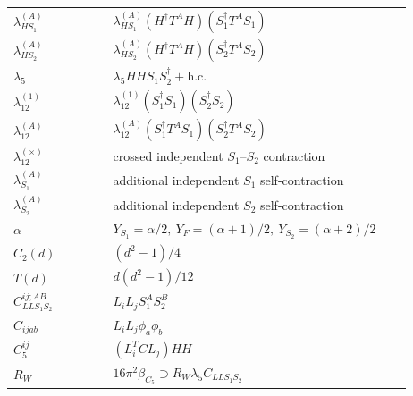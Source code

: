 \documentclass[8pt]{article}
\begin{document}
\begin{landscape}
\begin{longtable}{@{}p{0.23\linewidth}p{0.69\linewidth}@{}}
$\lambda_{HS_1}^{(A)}$ & $\lambda_{HS_1}^{(A)}(H^\dagger T^AH)(S_1^\dagger T^AS_1)$ \\
$\lambda_{HS_2}^{(A)}$ & $\lambda_{HS_2}^{(A)}(H^\dagger T^AH)(S_2^\dagger T^AS_2)$ \\
$\lambda_5$ & $\lambda_5HHS_1S_2^\dagger+\mathrm{h.c.}$ \\
$\lambda_{12}^{(1)}$ & $\lambda_{12}^{(1)}(S_1^\dagger S_1)(S_2^\dagger S_2)$ \\
$\lambda_{12}^{(A)}$ & $\lambda_{12}^{(A)}(S_1^\dagger T^AS_1)(S_2^\dagger T^AS_2)$ \\
$\lambda_{12}^{(\times)}$ & crossed independent $S_1$--$S_2$ contraction \\
$\lambda_{S_1}^{(A)}$ & additional independent $S_1$ self-contraction \\
$\lambda_{S_2}^{(A)}$ & additional independent $S_2$ self-contraction \\
$\alpha$ & $Y_{S_1}=\alpha/2,\ Y_F=(\alpha+1)/2,\ Y_{S_2}=(\alpha+2)/2$ \\
$C_2(d)$ & $(d^2-1)/4$ \\
$T(d)$ & $d(d^2-1)/12$ \\
$C_{LLS_1S_2}^{ij;AB}$ & $L_iL_jS_1^AS_2^B$ \\
$C_{ijab}$ & $L_iL_j\phi_a\phi_b$ \\
$C_5^{ij}$ & $(L_i^TCL_j)HH$ \\
$R_W$ & $16\pi^2\beta_{C_5}\supset R_W\lambda_5C_{LLS_1S_2}$ \\
\bottomrule
\end{longtable}
\tiny

\end{landscape}
\end{document}
